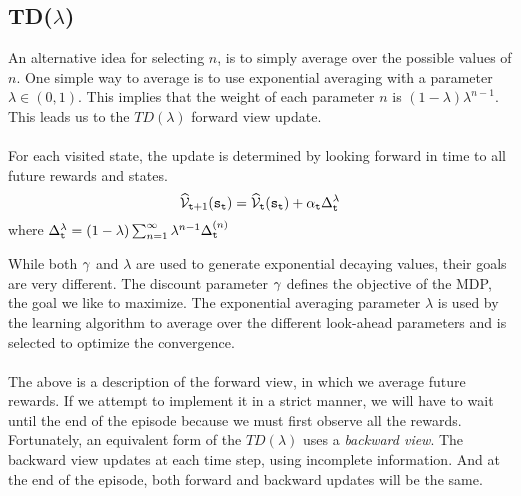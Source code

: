 \subsection{TD($\lambda$)}
An alternative idea for selecting $n$, is to simply average 
over the possible values of $n$. One simple way to average is to use
exponential averaging with a parameter $\lambda\in(0,1)$. 
This implies that the weight of each parameter $n$ is
$(1-\lambda)\lambda^{n-1}$.
This leads us to the $TD(\lambda)$ forward view update.\\

\\
For each visited state, the update is determined by looking forward in time to all future rewards and states.
\[
\widehat{\mathcal{V}}_{{\tt t}+1}({\tt s}_{\tt t})=\widehat{\mathcal{V}}_{{\tt t}}({\tt s}_{\tt t})+\alpha_{\tt t}\Delta^{\lambda}_{\tt t}
\]
where $\Delta^{\lambda}_{\tt t}= (1-\lambda)\sum_{n=1}^\infty\lambda^{n-1}\Delta^{(n)}_{\tt t}$

 While both $\gamma$ and $\lambda$ are used
to generate exponential decaying values, their goals are very
different. The discount parameter $\gamma$ defines the objective
of the MDP, the goal we like to maximize. The exponential
averaging parameter $\lambda$ is used by the learning algorithm to average over the different
look-ahead parameters and is selected to optimize the convergence.\\

\\
The above is a description of the forward view, in which we average future rewards.
If we attempt to implement it in a strict manner, 
we will have to wait until the end of the episode 
because we must first observe all the rewards. Fortunately,
an equivalent form of the $TD(\lambda)$ uses a {\em
backward view}. The backward view updates at each time step, using
incomplete information. And at the end of the episode, 
both forward and backward updates will be the same.

